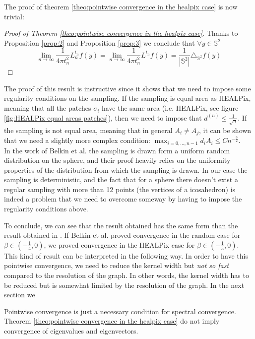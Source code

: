 The proof of theorem \ref{theo:pointwise convergence in the healpix case} is now trivial:
\begin{proof}[Proof of Theorem \ref{theo:pointwise convergence in the healpix case}]
	Thanks to Proposition \ref{prop:2} and Proposition \ref{prop:3}	we conclude that $\forall y\in\mathbb S^2 $
	$$\lim_{n\to\infty}\frac{1}{4\pi t_n^2} L_n^{t_n}f(y) =  \lim_{n\to\infty}\frac{1}{4\pi t_n^2} L^{t_n}f(y) = \frac{1}{|\mathbb S^2|}\triangle_{\mathbb S^2}f(y) $$
\end{proof}

The proof of this result is instructive since it shows that we need to impose some regularity conditions on the sampling. If the sampling is equal area as HEALPix, meaning that all the patches $\sigma_i$ have the same area (i.e. HEALPix, see figure \ref{fig:HEALPix equal areas patches}), then we need to impose that $ d^{(n)}\leq \frac{1}{\sqrt{n}}$. If the sampling is not equal area, meaning that in general $A_i\neq A_j$, it can be shown that we need a slightly more complex condition: $\max_{i=0,...,n-1}d_iA_i\leq Cn^{-\frac{3}{2}}$.\\
In the work of Belkin et al. the sampling is drawn form a uniform random distribution on the sphere, and their proof heavily relies on the uniformity properties of the distribution from which the sampling is drawn. In our case the sampling is deterministic, and the fact that for a sphere there doesn't exist a regular sampling with more than 12 points (the vertices of a icosahedron) is indeed a problem that we need to overcome someway by having to impose the regularity conditions above. 


To conclude, we can see that the result obtained has the same form than the result obtained in \cite{Belkin:2005:TTF:2138147.2138189}. If Belkin et al. proved convergence in the random case for $\beta \in (-\frac{1}{4}, 0)$, we proved convergence in the HEALPix case for $\beta \in (-\frac{1}{5}, 0)$. This kind of result can be interpreted in the following way. In order to have this pointwise convergence, we need to reduce the kernel width but \textit{not so fast} compared to the resolution of the graph. In other words, the kernel width has to be reduced but is somewhat limited by the resolution of the graph. In the next section we
\begin{remark}
	Pointwise convergence is just a necessary condition for spectral convergence.  Theorem \ref{theo:pointwise convergence in the healpix case} do not imply convergence of eigenvalues and eigenvectors.
\end{remark}

